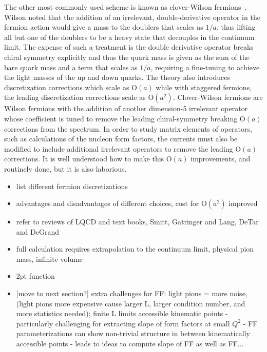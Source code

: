 The other most commonly used scheme is known as clover-Wilson fermions~.
Wilson noted that the addition of an irrelevant, double-derivative operator in the fermion action would give a mass to the doublers that scales as $1/a$, thus lifting all but one of the doublers to be a heavy state that decouples in the continuum limit.  The expense of such a treatment is the double derivative operator breaks chiral symmetry explicitly and thus the quark mass is given as the sum of the bare quark mass and a term that scales as $1/a$, requiring a fine-tuning to achieve the light masses of the up and down quarks.  The theory also introduces discretization corrections which scale as $\mathrm{O}(a)$ while with staggered fermions, the leading discretization corrections scale as $\mathrm{O}(a^2)$.
Clover-Wilson fermions are Wilson fermions with the addition of another dimension-5 irrelevant operator whose coefficient is tuned to remove the leading chiral-symmetry breaking $\mathrm{O}(a)$ corrections from the spectrum.
In order to study matrix elements of operators, such as calculations of the nucleon form factors, the currents must also be modified to include additional irrelevant operators to remove the leading $\mathrm{O}(a)$ corrections.
It is well understood how to make this $\mathrm{O}(a)$ improvements, and routinely done, but it is also laborious.









\begin{itemize}

\item list different fermion discretizations

\item advantages and disadvantages of different choices, cost for $\mathrm{O}(a^2)$ improved

\item refer to reviews of LQCD and text books, Smitt, Gatringer and Lang, DeTar and DeGrand

\item full calculation requires extrapolation to the continuum limit, physical pion mass, infinite volume

\item 2pt function

\item {\color{red}[move to next section?]} extra challenges for FF: light pions = more noise, (light pions more expensive cause larger L, larger condition number, and more statistics needed); finite L limits accessible kinematic points - particularly challenging for extracting slope of form factors at small $Q^2$ - FF parameterizations can show non-trivial structure in between kinematically accessible points - leads to ideas to compute slope of FF as well as FF...

\end{itemize}
